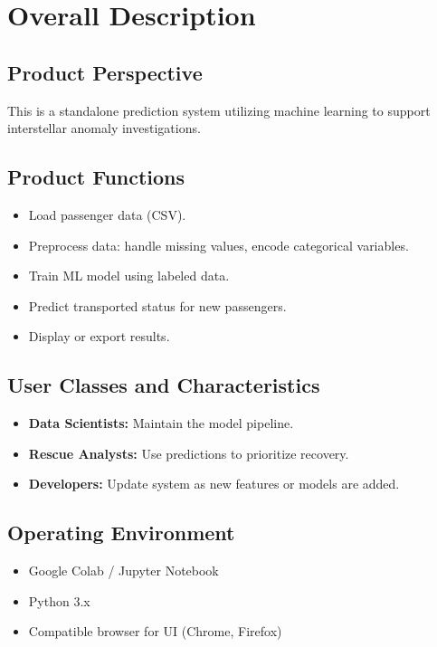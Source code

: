 \documentclass[15pt]{article}
\begin{document}
\section{Overall Description}
\subsection{Product Perspective}
This is a standalone prediction system utilizing machine learning to support interstellar anomaly investigations.

\subsection{Product Functions}
\begin{itemize}
    \item Load passenger data (CSV).
    \item Preprocess data: handle missing values, encode categorical variables.
    \item Train ML model using labeled data.
    \item Predict transported status for new passengers.
    \item Display or export results.
\end{itemize}

\subsection{User Classes and Characteristics}
\begin{itemize}
    \item \textbf{Data Scientists:} Maintain the model pipeline.
    \item \textbf{Rescue Analysts:} Use predictions to prioritize recovery.
    \item \textbf{Developers:} Update system as new features or models are added.
\end{itemize}

\subsection{Operating Environment}
\begin{itemize}
    \item Google Colab / Jupyter Notebook
    \item Python 3.x
    \item Compatible browser for UI (Chrome, Firefox)
\end{itemize}
\end{document}
